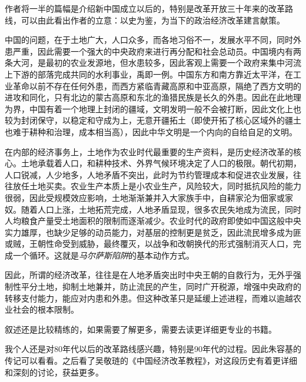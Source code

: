 作者将一半的篇幅是介绍新中国成立以后的，特别是改革开放三十年来的改革路线，可以由此看出作者的立意：以史为鉴，为当下的政治经济改革建言献策。

中国的问题，在于土地广大，人口众多，而各地习俗不一，发展水平不同，同时外患严重，因此需要一个强大的中央政府来进行再分配和社会总动员。中国境内有两条大河，是最初的农业发源地，但水患较多，因此客观上需要一个政府来集中河流上下游的部落完成共同的水利事业，禹即一例。中国东方和南方靠近太平洋，在工业革命以前不存在任何外患，而西方紧临青藏高原和中亚高原，隔绝了西方文明的进攻和同化，只有北边的蒙古高原和东北的渔猎民族是长久的外患。因此在此地理为界，中国有着一个地理上封闭的疆域，文明发明一般不会被打断，因此文化上也较为封闭保守，以稳定和守成为上，无意开疆拓土（即使开拓了核心区域外的疆土也难于耕种和治理，成本相当高），因此中华文明是一个内向的自给自足的文明。

在内部的经济事务上，土地作为农业时代最重要的生产资料，是历史经济改革的核心。土地承载着人口，和耕种技术、外界气候环境决定了人口的极限。朝代初期，人口锐减，人少地多，人地矛盾不突出，此时为节约管理成本和促进农业发展，往往放任土地买卖。农业生产本质上是小农业生产，风险较大，同时抵抗风险的能力很弱，因此受规模效应影响，土地渐渐兼并入大家族手中，自耕家沦为佃家或家奴。随着人口上涨，土地拓荒完成，人地矛盾显现，很多农民失地成为流民，同时人均粮食产量受土地面积的限制而逐渐减少。农业时代的政府即使如中国这般中央实力雄厚，也缺少足够的动员能力，对基层的控制更是贫乏，因此流民增多成为匪或贼，王朝性命受到威胁，最终覆灭，以战争和改朝换代的形式强制消灭人口，完成一个循环。这就是\emph{马尔萨斯陷阱}的基本动作方式。

因此，所谓的经济改革，往往是在人地矛盾突出时中央王朝的自救行为，无外乎强制性平分土地，抑制土地兼并，防止流民的产生，同时广开税源，增强中央政府的转移支付能力，能应对内患和外患。但这种改革只是延缓上述进程，而难以逾越农业社会的根本限制。

叙述还是比较精练的，如果需要了解更多，需要去读更详细更专业的书籍。

我个人还是对80年代以后的改革路线感兴趣，特别是90年代的过程。因此朱容基的传记可以看看。之后看了吴敬琏的《中国经济改革教程》，对这段历史有着更详细和深刻的讨论，获益更多。
